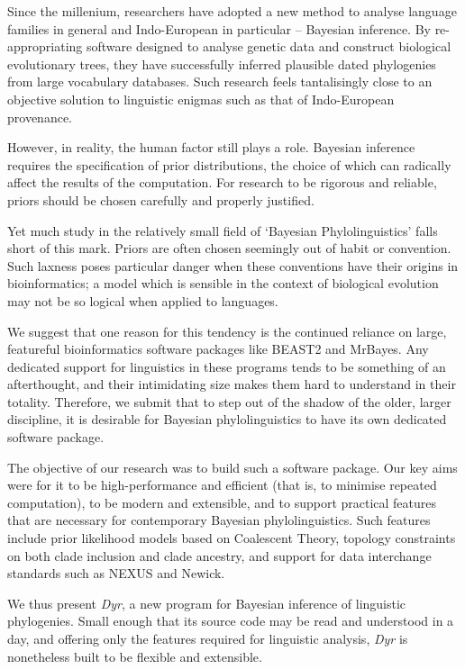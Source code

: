 \documentclass[10pt,journal,compsoc]{IEEEtran}
\begin{document}
Since the millenium, researchers have adopted a new method to analyse language families in general and Indo-European in particular -- Bayesian inference. By re-appropriating software designed to analyse genetic data and construct biological evolutionary trees, they have successfully inferred plausible dated phylogenies from large vocabulary databases. Such research feels tantalisingly close to an objective solution to linguistic enigmas such as that of Indo-European provenance.

However, in reality, the human factor still plays a role. Bayesian inference requires the specification of prior distributions, the choice of which can radically affect the results of the computation. For research to be rigorous and reliable, priors should be chosen carefully and properly justified.

Yet much study in the relatively small field of `Bayesian Phylolinguistics' falls short of this mark. Priors are often chosen seemingly out of habit or convention. Such laxness poses particular danger when these conventions have their origins in bioinformatics; a model which is sensible in the context of biological evolution may not be so logical when applied to languages.

We suggest that one reason for this tendency is the continued reliance on large, featureful bioinformatics software packages like BEAST2 and MrBayes. Any dedicated support for linguistics in these programs tends to be something of an afterthought, and their intimidating size makes them hard to understand in their totality. Therefore, we submit that to step out of the shadow of the older, larger discipline, it is desirable for Bayesian phylolinguistics to have its own dedicated software package.

The objective of our research was to build such a software package. Our key aims were for it to be high-performance and efficient (that is, to minimise repeated computation), to be modern and extensible, and to support practical features that are necessary for contemporary Bayesian phylolinguistics. Such features include prior likelihood models based on Coalescent Theory, topology constraints on both clade inclusion and clade ancestry, and support for data interchange standards such as NEXUS and Newick.

We thus present \textit{Dyr}, a new program for Bayesian inference of linguistic phylogenies. Small enough that its source code may be read and understood in a day, and offering only the features required for linguistic analysis, \textit{Dyr} is nonetheless built to be flexible and extensible. 
\end{document}
